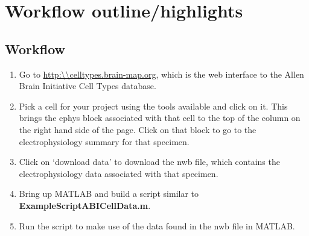 \documentclass{article}
\begin{document}
\section{Workflow outline/highlights}

\subsection{Workflow}
\begin{enumerate}
	\item Go to \url{http:\\celltypes.brain-map.org}, which is the web interface to the Allen Brain Initiative Cell Types database.
	\item Pick a cell for your project using the tools available and click on it.  This brings the ephys block associated with that cell to the top of the column on the right hand side of the page.  Click on that block to go to the electrophysiology summary for that specimen.
	\item Click on `download data' to download the nwb file, which contains the electrophysiology data associated with that specimen.
	\item Bring up MATLAB and build a script similar to \textbf{ExampleScriptABICellData.m}.
	\item Run the script to make use of the data found in the nwb file in MATLAB.
\end{enumerate}
\end{document}
